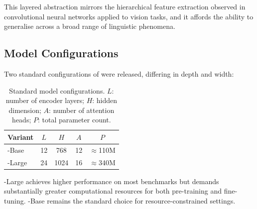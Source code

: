 This layered abstraction mirrors the hierarchical feature extraction observed in
convolutional neural networks applied to vision tasks, and it affords \bert{} the
ability to generalise across a broad range of linguistic phenomena.

\subsection{Model Configurations}
\label{subsec:configs}

Two standard configurations of \bert{} were released, differing in depth and width:

\begin{table}[H]
  \centering
  \caption{Standard \bert{} model configurations.  $L$: number of encoder layers;
           $H$: hidden dimension; $A$: number of attention heads;
           $P$: total parameter count.}
  \label{tab:configs}
  \renewcommand{\arraystretch}{1.25}
  \begin{tabular}{lcccc}
    \toprule
    \textbf{Variant} & $L$ & $H$ & $A$ & $P$ \\
    \midrule
    \bert{}-Base  & 12 & 768  & 12 & $\approx$110M \\
    \bert{}-Large & 24 & 1024 & 16 & $\approx$340M \\
    \bottomrule
  \end{tabular}
\end{table}

\bert{}-Large achieves higher performance on most benchmarks but demands
substantially greater computational resources for both pre-training and fine-tuning.
\bert{}-Base remains the standard choice for resource-constrained settings.
